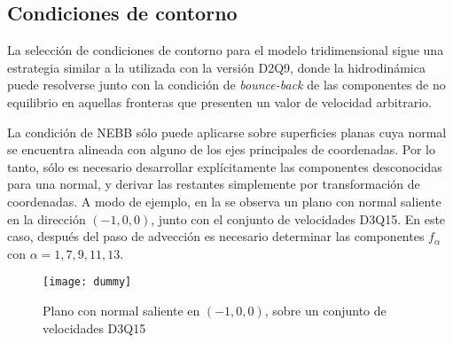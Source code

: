 \subsection{Condiciones de contorno}
\label{sec:nebb_d3q15}

La selecci\'on de condiciones de contorno para el modelo tridimensional sigue una estrategia similar a la utilizada con la versi\'on D2Q9, donde la \lbe{} hidrodin\'amica puede resolverse junto con la condici\'on de \emph{bounce-back} de las componentes de no equilibrio en aquellas fronteras que presenten un valor de velocidad arbitrario.

La condici\'on de NEBB s\'olo puede aplicarse sobre superficies planas cuya normal se encuentra alineada con alguno de los ejes principales de coordenadas. Por lo tanto, s\'olo es necesario desarrollar expl\'icitamente las componentes desconocidas para una normal, y derivar las restantes simplemente por transformaci\'on de coordenadas. A modo de ejemplo, en la  se observa un plano con normal saliente en la direcci\'on $(-1,0,0)$, junto con el conjunto de velocidades D3Q15. En este caso, despu\'es del paso de advecci\'on es necesario determinar las componentes $f_{\alpha}$ con $\alpha=1,7,9,11,13$. 
\begin{figure}[ht]
	\centering
	\texttt{[image: dummy]}
	\caption{Plano con normal saliente en $(-1,0,0)$, sobre un conjunto de velocidades D3Q15}
	\label{fig:d3q15_normal_plane}
\end{figure}

